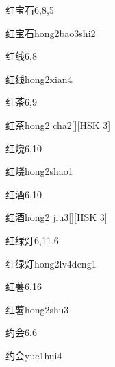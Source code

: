 \begin{entry}{红宝石}{6,8,5}
  \begin{phonetics}{红宝石}{hong2bao3shi2}
  \end{phonetics}
\end{entry}

\begin{entry}{红线}{6,8}
  \begin{phonetics}{红线}{hong2xian4}
  \end{phonetics}
\end{entry}

\begin{entry}{红茶}{6,9}
  \begin{phonetics}{红茶}{hong2 cha2}[][HSK 3]
  \end{phonetics}
\end{entry}

\begin{entry}{红烧}{6,10}
  \begin{phonetics}{红烧}{hong2shao1}
  \end{phonetics}
\end{entry}

\begin{entry}{红酒}{6,10}
  \begin{phonetics}{红酒}{hong2 jiu3}[][HSK 3]
  \end{phonetics}
\end{entry}

\begin{entry}{红绿灯}{6,11,6}
  \begin{phonetics}{红绿灯}{hong2lv4deng1}
  \end{phonetics}
\end{entry}

\begin{entry}{红薯}{6,16}
  \begin{phonetics}{红薯}{hong2shu3}
  \end{phonetics}
\end{entry}

\begin{entry}{约会}{6,6}
  \begin{phonetics}{约会}{yue1hui4}
  \end{phonetics}
\end{entry}

